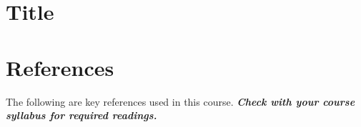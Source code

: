 \documentclass[
]{book}
\theoremstyle{definition}
\theoremstyle{definition}
\theoremstyle{definition}
\theoremstyle{definition}
\theoremstyle{remark}
\begin{document}
\hypertarget{title}{%
\chapter{Title}\label{title}}

\hypertarget{references}{%
\chapter*{References}\label{references}}

The following are key references used in this course. \textbf{\emph{Check with your course syllabus for required readings.}}

  
\end{document}
